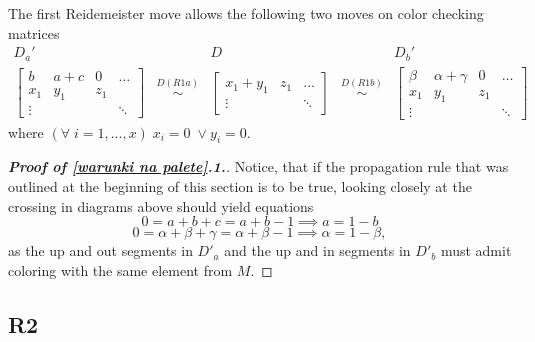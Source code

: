 The first Reidemeister move allows the following two moves on color checking matrices
$$
\begin{matrix}
  D_a' & & D & & D_b'\\ 
  \begin{bmatrix}
    b & a+c  & 0 & \hdots\\ 
    x_1 & y_1 & z_1 \\ 
    \vdots & & & \ddots
  \end{bmatrix} 
       & \overset{D(R1a)}{\sim} &
     \begin{bmatrix}
       x_1 + y_1 & z_1 & \hdots\\ 
       \vdots & & \ddots
     \end{bmatrix} 
       & \overset{D(R1b)}{\sim} &
  \begin{bmatrix}
    \beta & \alpha+\gamma  & 0 & \hdots\\ 
    x_1 & y_1 & z_1 \\ 
    \vdots & & & \ddots
  \end{bmatrix} 
\end{matrix}
$$
where $(\forall\;i=1,...,x)\;x_i=0\;\lor y_i=0$.

\begin{proof}[{\bfseries Proof of \cref{warunki na palete}.1.}]
Notice, that if the propagation rule that was outlined at the beginning of this section is to be true, looking closely at the crossing in diagrams above should yield equations
$$0=a+b+c=a+b-1\implies a=1-b$$
$$0=\alpha+\beta+\gamma=\alpha+\beta-1\implies \alpha=1-\beta,$$
as the up and out segments in $D'_a$ and the up and in segments in $D'_b$ must admit coloring with the same element from $M$.
\end{proof}

\subsection*{\centering R2}

